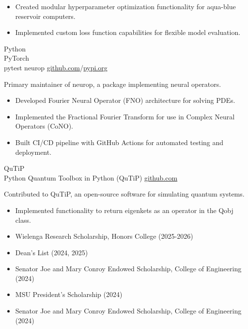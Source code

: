 \documentclass[9pt]{developercv} %
\begin{document}
\begin{entrylist}
{		\begin{itemize}[noitemsep,topsep=0pt,parsep=0pt,partopsep=0pt, leftmargin=7pt]
		\item Created modular hyperparameter optimization functionality for aqua-blue reservoir computers.
		\item Implemented custom loss function capabilities for flexible model evaluation.
        \end{itemize}
		}
	\entry
		{Python \\ PyTorch \\ pytest}
		{neurop}
		{\href{https://github.com/lonelyneutrin0/neurop/}{github.com}/\href{https://pypi.org/project/neurop/}{pypi.org}}
		{Primary maintainer of neurop, a package implementing neural operators.
		\begin{itemize}[noitemsep,topsep=0pt,parsep=0pt,partopsep=0pt, leftmargin=7pt]
		\item Developed Fourier Neural Operator (FNO) architecture for solving PDEs.
		\item Implemented the Fractional Fourier Transform for use in Complex Neural Operators (CoNO).
		\item Built CI/CD pipeline with GitHub Actions for automated testing and deployment.
		\end{itemize}
		}
\end{entrylist}
\begin{entrylist}
	\entry
		{QuTiP \\ Python}
		{Quantum Toolbox in Python (QuTiP)}
		{\href{https://github.com/qutip/qutip}{github.com}}
		{Contributed to QuTiP, an open-source software for simulating quantum systems.
		\begin{itemize}[noitemsep,topsep=0pt,parsep=0pt,partopsep=0pt, leftmargin=7pt]
		\item Implemented functionality to return eigenkets as an operator in the Qobj class.
		\end{itemize}
		}
\end{entrylist}
\vspace{-10pt}
\begin{itemize}
	\item Wielenga Research Scholarship, Honors College (2025-2026)
	\item Dean's List (2024, 2025)
	\item Senator Joe and Mary Conroy Endowed Scholarship, College of Engineering (2024)
	\item MSU President's Scholarship (2024)
	\item Senator Joe and Mary Conroy Endowed Scholarship, College of Engineering (2024)
\end{itemize}
\end{document}
